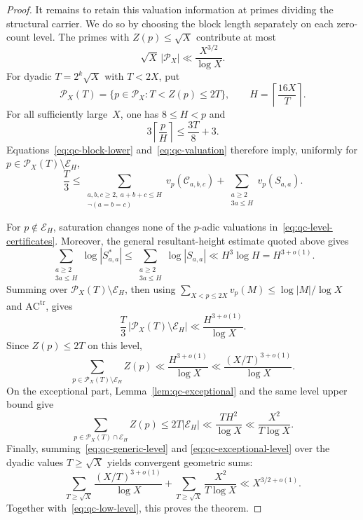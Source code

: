 \begin{proof}
It remains to retain this valuation information at primes dividing the
structural carrier.  We do so by choosing the block length separately
on each zero-count level.  The primes with $Z(p)\le\sqrt X$ contribute
at most
\begin{equation}\label{eq:qc-low-level}
 \sqrt X\,|\mathcal P_X|\ll\frac{X^{3/2}}{\log X}.
\end{equation}
For dyadic $T=2^k\sqrt X$ with $T<2X$, put
\[
 \mathcal P_X(T)=\{p\in\mathcal P_X:T<Z(p)\le2T\},
 \qquad H=\left\lceil\frac{16X}{T}\right\rceil.
\]
For all sufficiently large~$X$, one has $8\le H<p$ and
\[
 3\left\lceil\frac pH\right\rceil
 \le \frac{3T}{8}+3.
\]
Equations~\eqref{eq:qc-block-lower} and~\eqref{eq:qc-valuation}
therefore imply, uniformly for
$p\in\mathcal P_X(T)\setminus\mathcal E_H$,
\begin{equation}\label{eq:qc-level-certificates}
 \frac T3\le
 \sum_{\substack{a,b,c\ge2,\ a+b+c\le H\\
                  \neg(a=b=c)}}
 v_p(\mathcal C_{a,b,c})
 +\sum_{\substack{a\ge2\\3a\le H}}v_p(S_{a,a}).
\end{equation}

For $p\notin\mathcal E_H$, saturation changes none of the
$p$-adic valuations in~\eqref{eq:qc-level-certificates}.  Moreover,
the general resultant-height estimate quoted above gives
\[
 \sum_{\substack{a\ge2\\3a\le H}}\log|S^*_{a,a}|
 \le \sum_{\substack{a\ge2\\3a\le H}}\log|S_{a,a}|
 \ll H^3\log H=H^{3+o(1)}.
\]
Summing over
$\mathcal P_X(T)\setminus\mathcal E_H$, then using
$\sum_{X<p\le2X}v_p(M)\le\log|M|/\log X$ and
$\mathrm{AC}^{\mathrm{tr}}$, gives
\[
 \frac T3\,|\mathcal P_X(T)\setminus\mathcal E_H|
 \ll\frac{H^{3+o(1)}}{\log X}.
\]
Since $Z(p)\le2T$ on this level,
\begin{equation}\label{eq:qc-generic-level}
 \sum_{p\in\mathcal P_X(T)\setminus\mathcal E_H}Z(p)
 \ll\frac{H^{3+o(1)}}{\log X}
 \ll\frac{(X/T)^{3+o(1)}}{\log X}.
\end{equation}
On the exceptional part, Lemma~\ref{lem:qc-exceptional} and the same
level upper bound give
\begin{equation}\label{eq:qc-exceptional-level}
 \sum_{p\in\mathcal P_X(T)\cap\mathcal E_H}Z(p)
 \le2T|\mathcal E_H|
 \ll\frac{TH^2}{\log X}
 \ll\frac{X^2}{T\log X}.
\end{equation}
Finally, summing~\eqref{eq:qc-generic-level} and
\eqref{eq:qc-exceptional-level} over the dyadic values
$T\ge\sqrt X$ yields convergent geometric sums:
\[
 \sum_{T\ge\sqrt X}\frac{(X/T)^{3+o(1)}}{\log X}
 +\sum_{T\ge\sqrt X}\frac{X^2}{T\log X}
 \ll X^{3/2+o(1)}.
\]
Together with~\eqref{eq:qc-low-level}, this proves the theorem.
\end{proof}

